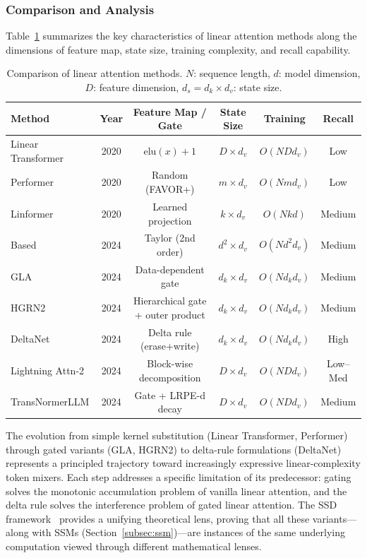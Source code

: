 \subsubsection{Comparison and Analysis}

Table~\ref{tab:linear-attn-comparison} summarizes the key characteristics of linear attention methods along the dimensions of feature map, state size, training complexity, and recall capability.

\begin{table}[t]
\centering
\caption{Comparison of linear attention methods. $N$: sequence length, $d$: model dimension, $D$: feature dimension, $d_s = d_k \times d_v$: state size.}
\label{tab:linear-attn-comparison}
\small
\begin{tabular}{lccccc}
\toprule
\textbf{Method} & \textbf{Year} & \textbf{Feature Map / Gate} & \textbf{State Size} & \textbf{Training} & \textbf{Recall} \\
\midrule
Linear Transformer & 2020 & $\text{elu}(x)+1$ & $D \times d_v$ & $O(NDd_v)$ & Low \\
Performer          & 2020 & Random (FAVOR+) & $m \times d_v$ & $O(Nmd_v)$ & Low \\
Linformer          & 2020 & Learned projection & $k \times d_v$ & $O(Nkd)$ & Medium \\
Based              & 2024 & Taylor (2nd order) & $d^2 \times d_v$ & $O(Nd^2 d_v)$ & Medium \\
GLA                & 2024 & Data-dependent gate & $d_k \times d_v$ & $O(Nd_k d_v)$ & Medium \\
HGRN2              & 2024 & Hierarchical gate + outer product & $d_k \times d_v$ & $O(Nd_k d_v)$ & Medium \\
DeltaNet           & 2024 & Delta rule (erase+write) & $d_k \times d_v$ & $O(Nd_k d_v)$ & High \\
Lightning Attn-2   & 2024 & Block-wise decomposition & $D \times d_v$ & $O(ND d_v)$ & Low--Med \\
TransNormerLLM     & 2024 & Gate + LRPE-d decay & $D \times d_v$ & $O(NDd_v)$ & Medium \\
\bottomrule
\end{tabular}
\end{table}

The evolution from simple kernel substitution (Linear Transformer, Performer) through gated variants (GLA, HGRN2) to delta-rule formulations (DeltaNet) represents a principled trajectory toward increasingly expressive linear-complexity token mixers. Each step addresses a specific limitation of its predecessor: gating solves the monotonic accumulation problem of vanilla linear attention, and the delta rule solves the interference problem of gated linear attention. The SSD framework~\cite{dao2024transformers} provides a unifying theoretical lens, proving that all these variants---along with SSMs (Section~\ref{subsec:ssm})---are instances of the same underlying computation viewed through different mathematical lenses.

